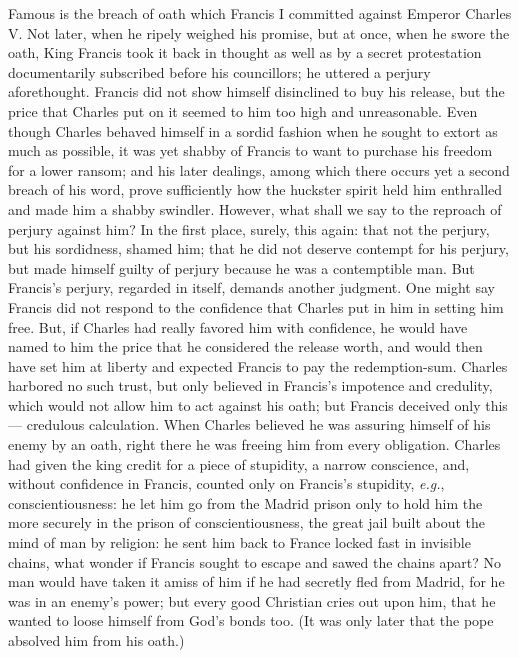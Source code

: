 Famous is the breach of oath which Francis I committed against Emperor Charles 
V. Not later, when he ripely weighed his promise, but at once, when he swore 
the oath, King Francis took it back in thought as well as by a secret 
protestation documentarily subscribed before his councillors; he uttered a 
perjury aforethought. Francis did not show himself disinclined to buy his 
release, but the price that Charles put on it seemed to him too high and 
unreasonable. Even though Charles behaved himself in a sordid fashion when he 
sought to extort as much as possible, it was yet shabby of Francis to want to 
purchase his freedom for a lower ransom; and his later dealings, among which 
there occurs yet a second breach of his word, prove sufficiently how the 
huckster spirit held him enthralled and made him a shabby swindler. However, 
what shall we say to the reproach of perjury against him? In the first place, 
surely, this again: that not the perjury, but his sordidness, shamed him; that 
he did not deserve contempt for his perjury, but made himself guilty of 
perjury because he was a contemptible man. But Francis's perjury, regarded in 
itself, demands another judgment. One might say Francis did not respond to the 
confidence that Charles put in him in setting him free. But, if Charles had 
really favored him with confidence, he would have named to him the price that 
he considered the release worth, and would then have set him at liberty and 
expected Francis to pay the redemption-sum. Charles harbored no such trust, 
but only believed in Francis's impotence and credulity, which would not allow 
him to act against his oath; but Francis deceived only this --- credulous 
calculation. When Charles believed he was assuring himself of his enemy by an 
oath, right there he was freeing him from every obligation. Charles had given 
the king credit for a piece of stupidity, a narrow conscience, and, without 
confidence in Francis, counted only on Francis's stupidity, \textit{e.g.}, 
conscientiousness: he let him go from the Madrid prison only to hold him the 
more securely in the prison of conscientiousness, the great jail built about 
the mind of man by religion: he sent him back to France locked fast in 
invisible chains, what wonder if Francis sought to escape and sawed the chains 
apart? No man would have taken it amiss of him if he had secretly fled from 
Madrid, for he was in an enemy's power; but every good Christian cries out 
upon him, that he wanted to loose himself from God's bonds too. (It was only 
later that the pope absolved him from his oath.)

